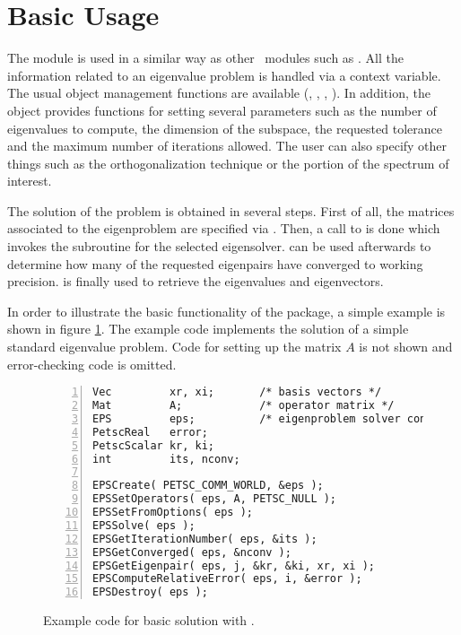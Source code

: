 \section{Basic Usage}

	The  module is used in a similar way as other \petsc\ modules such as . All the information related to an eigenvalue problem is handled via a context variable. The usual object management functions are available (, , , ). In addition, the  object provides functions for setting several parameters such as the number of eigenvalues to compute, the dimension of the subspace, the requested tolerance and the maximum number of iterations allowed. The user can also specify other things such as the orthogonalization technique or the portion of the spectrum of interest.

	The solution of the problem is obtained in several steps. First of all, the matrices associated to the eigenproblem are specified via . Then, a call to  is done which invokes the subroutine for the selected eigensolver.  can be used afterwards to determine how many of the requested eigenpairs have converged to working precision.  is finally used to retrieve the eigenvalues and eigenvectors. 

	In order to illustrate the basic functionality of the  package, a simple example is shown in figure \ref{fig:ex-eps}. The example code implements the solution of a simple standard eigenvalue problem. Code for setting up the matrix $A$ is not shown and error-checking code is omitted.

\begin{figure}[t]
\begin{Verbatim}[fontsize=\small,numbers=left,numbersep=6pt,xleftmargin=15mm]
Vec         xr, xi;       /* basis vectors */
Mat         A;            /* operator matrix */
EPS         eps;          /* eigenproblem solver context */
PetscReal   error;
PetscScalar kr, ki;
int         its, nconv;

EPSCreate( PETSC_COMM_WORLD, &eps );
EPSSetOperators( eps, A, PETSC_NULL );
EPSSetFromOptions( eps );
EPSSolve( eps );
EPSGetIterationNumber( eps, &its );
EPSGetConverged( eps, &nconv );
EPSGetEigenpair( eps, j, &kr, &ki, xr, xi );
EPSComputeRelativeError( eps, i, &error );
EPSDestroy( eps );
\end{Verbatim}
\caption{\label{fig:ex-eps}Example code for basic solution with .}
\end{figure}

